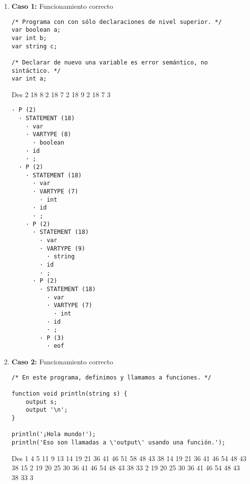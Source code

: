 \begin{enumerate}

    \item \textbf{Caso 1:} Funcionamiento correcto
    \begin{tcolorbox}[title={Código fuente}, colback=white, breakable]
        \begin{lstlisting}
/* Programa con con sólo declaraciones de nivel superior. */
var boolean a;
var int b;
var string c;

/* Declarar de nuevo una variable es error semántico, no sintáctico. */
var int a;
        \end{lstlisting}
    \end{tcolorbox}

    \begin{tcolorbox}[title={Volcado del fichero de parse}, colback=white]
Des 2 18 8 2 18 7 2 18 9 2 18 7 3
    \end{tcolorbox}

    \begin{tcolorbox}[title={Árbol sintáctico generado con la herramienta VASt}, colback=white]
        \begin{lstlisting}
· P (2)
  · STATEMENT (18)
    · var
    · VARTYPE (8)
      · boolean
    · id
    · ;
  · P (2)
    · STATEMENT (18)
      · var
      · VARTYPE (7)
        · int
      · id
      · ;
    · P (2)
      · STATEMENT (18)
        · var
        · VARTYPE (9)
          · string
        · id
        · ;
      · P (2)
        · STATEMENT (18)
          · var
          · VARTYPE (7)
            · int
          · id
          · ;
        · P (3)
          · eof
        \end{lstlisting}
    \end{tcolorbox}


    \item \textbf{Caso 2:} Funcionamiento correcto
    \begin{tcolorbox}[title={Código fuente}, colback=white, breakable]
        \begin{lstlisting}
/* En este programa, definimos y llamamos a funciones. */

function void println(string s) {
    output s;
    output '\n';
}

println('¡Hola mundo!');
println('Eso son llamadas a \'output\' usando una función.');
        \end{lstlisting}
    \end{tcolorbox}

    \begin{tcolorbox}[title={Volcado del fichero de parse}, colback=white]
Des 1 4 5 11 9 13 14 19 21 36 41 46 51 58 48 43 38 14 19 21 36 41 46 54 48 43 38 15 2 19 20 25 30 36 41 46 54 48 43 38 33 2 19 20 25 30 36 41 46 54 48 43 38 33 3
    \end{tcolorbox}


\end{enumerate}
